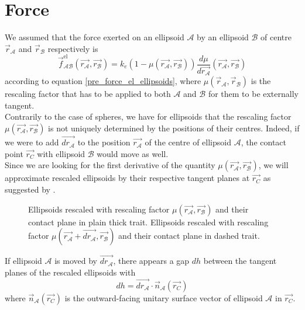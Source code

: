 \documentclass[class=report, float=false, crop=false]{standalone}
\begin{document}
\section{Force}

We assumed that the force exerted on an ellipsoid $\mathcal{A}$ by an ellipsoid $\mathcal{B}$ of centre $\vec{r}_{\mathcal{A}}$ and $\vec{r}_{\mathcal{B}}$ respectively is
\begin{equation}
\vec{f}_{\mathcal{A}\mathcal{B}}^{\text{el}}(\vec{r_{\mathcal{A}}},\vec{r_{\mathcal{B}}}) = k_e (1 - \mu(\vec{r_{\mathcal{A}}},\vec{r_{\mathcal{B}}}))\frac{d\mu}{d\vec{r_{\mathcal{A}}}}(\vec{r_{\mathcal{A}}},\vec{r_{\mathcal{B}}})
\end{equation}
according to equation \ref{pre_force_el_ellipsoids}, where $\mu(\vec{r}_{\mathcal{A}},\vec{r}_{\mathcal{B}})$ is the rescaling factor that has to be applied to both $\mathcal{A}$ and $\mathcal{B}$ for them to be externally tangent.\\

Contrarily to the case of spheres, we have for ellipsoids that the rescaling factor $\mu(\vec{r_{\mathcal{A}}},\vec{r_{\mathcal{B}}})$ is not uniquely determined by the positions of their centres. Indeed, if we were to add $\vec{dr_{\mathcal{A}}}$ to the position $\vec{r_{\mathcal{A}}}$ of the centre of ellipsoid $\mathcal{A}$, the contact point $\vec{r_C}$ with ellipsoid $\mathcal{B}$ would move as well.\\

Since we are looking for the first derivative of the quantity $\mu(\vec{r_{\mathcal{A}}},\vec{r_{\mathcal{B}}})$, we will approximate rescaled ellipsoids by their respective tangent planes at $\vec{r_C}$ as suggested by \cite{donev}.\\

\begin{figure}[h!]
\centering

\caption{Ellipsoids rescaled with rescaling factor $\mu(\vec{r_{\mathcal{A}}},\vec{r_{\mathcal{B}}})$ and their contact plane in plain thick trait. Ellipsoids rescaled with rescaling factor $\mu(\vec{r_{\mathcal{A}}} + \vec{dr_{\mathcal{A}}},\vec{r_{\mathcal{B}}})$ and their contact plane in dashed trait.}
\label{contact_points_fig}
\end{figure}

If ellipsoid $\mathcal{A}$ is moved by $\vec{dr_{\mathcal{A}}}$, there appears a gap $dh$ between the tangent planes of the rescaled ellipsoids with
\begin{equation}
dh = \vec{dr_{\mathcal{A}}}\cdot\vec{n}_{\mathcal{A}}(\vec{r_C})
\label{dh}
\end{equation}
where $\vec{n}_{\mathcal{A}}(\vec{r_C})$ is the outward-facing unitary surface vector of ellipsoid $\mathcal{A}$ in $\vec{r_C}$.\\
\end{document}
